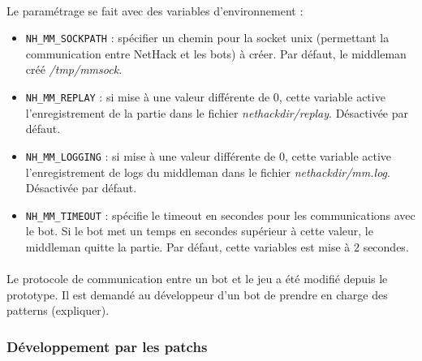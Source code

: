 \documentclass[a4paper,11pt]{article}
\begin{document}
\paragraph{}Le paramétrage se fait avec des variables d'environnement :
\begin{itemize}
\item \verb!NH_MM_SOCKPATH! : spécifier un chemin pour la socket unix (permettant la communication entre NetHack et les bots) à créer. Par défaut, le middleman créé \emph{/tmp/mmsock}.
\item \verb!NH_MM_REPLAY! : si mise à une valeur différente de 0, cette variable active l'enregistrement de la partie dans le fichier \emph{nethackdir/replay}. Désactivée par défaut.
\item \verb!NH_MM_LOGGING! : si mise à une valeur différente de 0, cette variable active l'enregistrement de logs du middleman dans le fichier \emph{nethackdir/mm.log}. Désactivée par défaut.
\item \verb!NH_MM_TIMEOUT! : spécifie le timeout en secondes pour les communications avec le bot. Si le bot met un temps en secondes supérieur à cette valeur, le middleman quitte la partie. Par défaut, cette variables est mise à 2 secondes.
\end{itemize}

\paragraph{}Le protocole de communication entre un bot et le jeu a été modifié depuis le prototype. Il est demandé au développeur d'un bot de prendre en charge des patterns (expliquer).


\subsubsection*{Développement par les patchs}
\end{document}
